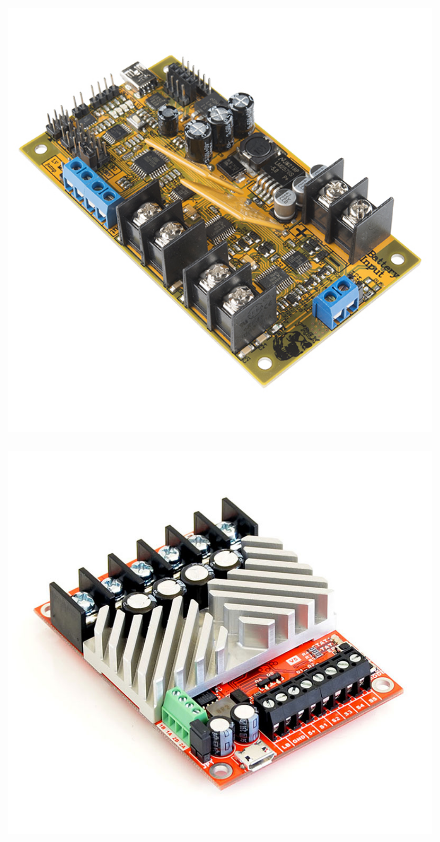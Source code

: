 \begin{figure}[H]
    \centering
    \begin{minipage}{.5\textwidth}
        \centering
        \includegraphics[width=0.8\linewidth]{figures/trex.jpg}
        \label{fig:test1}
    \end{minipage}%
    \begin{minipage}{.5\textwidth}
        \centering
        \includegraphics[width=0.8\linewidth]{figures/roboclaw.jpg}
        \label{fig:test1}
    \end{minipage}
\end{figure}

